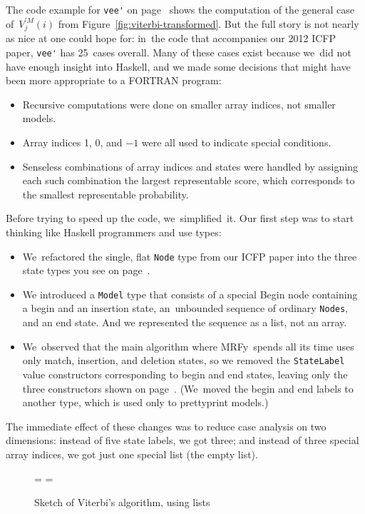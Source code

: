 \documentclass[]{jfp1}
\newcommand\mrfy{MRFy} %
\newcommand\figref[1]{Figure~\ref{fig:#1}}
\newcommand\figlabel[1]{\label{fig:#1}}
\newif\ifverbatimsmall
\newcommand\smallverbatiminput[1]{%
  \verbatimsmalltrue
  \presvtopsep=\topsep
  \topsep=0.78\topsep
  \verbatimsmallfalse
  \topsep=\presvtopsep
}
\begin{document}
The code example for \verb+vee'+ on page~\pageref{code:vee-prime}
shows the computation of the general case of~$V^{\prime M}_j(i)$ from 
\figref{viterbi-transformed}.
But the full story is not nearly as nice at one could hope for:
in~the code that accompanies our 2012 ICFP paper,
\verb+vee'+ has 25~cases overall.
Many of these cases exist because we~did not have enough insight into
Haskell, and we made some decisions that might have been more
appropriate to a FORTRAN program:
\begin{itemize}
\item
Recursive computations were done on smaller array indices, not smaller
models.
\item
Array indices 1, 0, and $-1$ were all used to indicate special
conditions.
\item
Senseless combinations of array indices and states were handled by
assigning each such combination the largest representable score, which
corresponds to the smallest representable probability.
\end{itemize}
Before trying to speed up the code, we~simplified~it.
%
%
Our first step was to start thinking like Haskell
programmers and use types:
\begin{itemize}
\item
We~refactored the single, flat \texttt{Node} type from our ICFP paper
into the three state types you see on page~\pageref{code:model3-node}.
\item 
We introduced a \texttt{Model} type that consists of a special Begin
node containing a begin and an insertion state, an~unbounded sequence
of ordinary \texttt{Nodes}, and an end state.
And we represented the sequence as a list, not an array.
\item
We~observed that the main algorithm where \mrfy\ spends all its time
uses only match, insertion, and deletion states, so we removed the
\texttt{StateLabel} value constructors corresponding to begin and end
states, leaving only the three constructors shown on
page~\pageref{code:state-label}. 
(We~moved the begin and end labels to another type, which is used only
to prettyprint models.) 
\end{itemize}
The immediate effect of these changes was to reduce case analysis on
two dimensions:
instead of five state labels, we got three;
and instead of three special array indices, we got just one special
list (the empty list).

\begin{figure}
\noindent\hspace*{1.5cm}\begin{minipage}{9cm}
\smallverbatiminput{list-viterbi}
\smallskip
\end{minipage}

\caption{Sketch of Viterbi's algorithm, using lists}
\figlabel{list-viterbi}
\end{figure}
\end{document}
